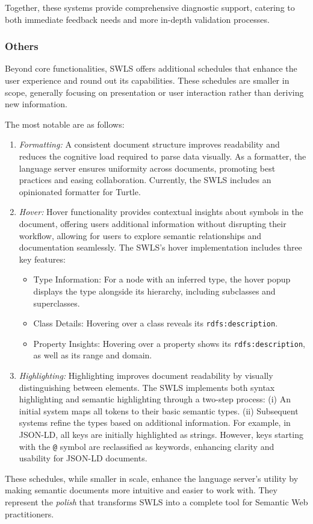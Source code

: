 Together, these systems provide comprehensive diagnostic support, catering to both immediate feedback needs and more in-depth validation processes.

\subsubsection{Others}

Beyond core functionalities, SWLS offers additional schedules that enhance the user experience and round out its capabilities.
These schedules are smaller in scope, generally focusing on presentation or user interaction rather than deriving new information.

The most notable are as follows:
\begin{enumerate}
  \item \textit{Formatting:}
    A consistent document structure improves readability and reduces the cognitive load required to parse data visually.
    As a formatter, the language server ensures uniformity across documents, promoting best practices and easing collaboration.
    Currently, the SWLS includes an opinionated formatter for Turtle.

  \item \textit{Hover:}
    Hover functionality provides contextual insights about symbols in the document, offering users additional information without disrupting their workflow,
    allowing for users to explore semantic relationships and documentation seamlessly.
    The SWLS’s hover implementation includes three key features:
    \begin{itemize}
      \item Type Information: For a node with an inferred type, the hover popup displays the type alongside its hierarchy, including subclasses and superclasses.
      \item Class Details: Hovering over a class reveals its \texttt{rdfs:description}.
      \item Property Insights: Hovering over a property shows its \texttt{rdfs:description}, as well as its range and domain.
    \end{itemize}

  \item \textit{Highlighting:}
    Highlighting improves document readability by visually distinguishing between elements.
    The SWLS implements both syntax highlighting and semantic highlighting through a two-step process:
        (i) An initial system maps all tokens to their basic semantic types.
        (ii) Subsequent systems refine the types based on additional information.
    For example, in JSON-LD, all keys are initially highlighted as strings.
    However, keys starting with the \texttt{@} symbol are reclassified as keywords, enhancing clarity and usability for JSON-LD documents.
\end{enumerate}

These schedules, while smaller in scale, enhance the language server’s utility by making semantic documents more intuitive and easier to work with.
They represent the \textit{polish} that transforms SWLS into a complete tool for Semantic Web practitioners.
